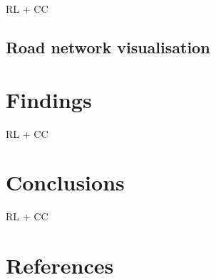 \documentclass[galley]{jtlu-article-2col}
\begin{document}
RL + CC

\hypertarget{road-network-visualisation}{%
\subsection{Road network visualisation}\label{road-network-visualisation}}

\hypertarget{findings}{%
\section{Findings}\label{findings}}

RL + CC

\hypertarget{conclusions}{%
\section{Conclusions}\label{conclusions}}

RL + CC

\hypertarget{references}{%
\section*{References}\label{references}}
\end{document}

